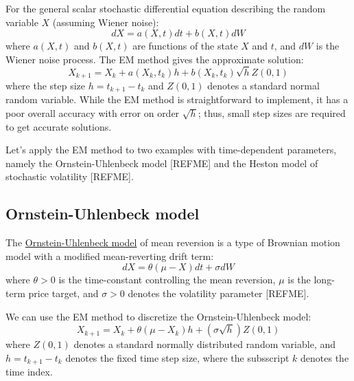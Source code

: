 \documentclass[11pt]{article}
\theoremstyle{definition}
\begin{document}
\begin{definition}\label{defn-em-method}
For the general scalar stochastic differential equation describing the random variable $X$ (assuming Wiener noise):
\begin{equation*}\label{eqn-generic-scalar-sde}
dX = a(X,t)dt + b(X,t)dW
\end{equation*}
where $a(X,t)$ and $b(X,t)$ are functions of the state $X$ and $t$, and $dW$ is the Wiener noise process.
The EM method gives the approximate solution:
\begin{equation*}\label{eqn-em-method}
X_{k+1} = X_{k} + a(X_{k}, t_{k})h + b(X_{k},t_{k})\sqrt{h}Z\left(0,1\right)
\end{equation*}
where the step size $h=t_{k+1} - t_{k}$ and $Z(0,1)$ denotes a standard normal random variable.  
While the EM method is straightforward to implement, it has a poor overall accuracy with error on order $\sqrt{h}$; 
thus, small step sizes are required to get accurate solutions.
\end{definition}
Let's apply the EM method to two examples with time-dependent parameters, 
namely the Ornstein-Uhlenbeck model [REFME] and the Heston model of stochastic volatility [REFME].

\subsection*{Ornstein-Uhlenbeck model}
The \href{https://en.wikipedia.org/wiki/Ornstein–Uhlenbeck_process}{Ornstein-Uhlenbeck model} of mean reversion is a type of Brownian motion model 
with a modified mean-reverting drift term:
\begin{equation*}\label{eqn-ou-model}
dX = \theta\left(\mu-X\right)dt + {\sigma}dW
\end{equation*}
where $\theta>0$ is the time-constant controlling the mean reversion, 
$\mu$ is the long-term price target, and $\sigma>0$ denotes the volatility parameter [REFME]. 

\begin{definition}\label{defn-ou-model}
We can use the EM method to discretize the Ornstein-Uhlenbeck model:
\begin{equation*}\label{eqn-EM-soln-OU-model}
X_{k+1} = X_{k} + \theta\left(\mu-X_{k}\right)h + \left(\sigma\sqrt{h}\right)Z(0,1)
\end{equation*}
where $Z(0,1)$ denotes a standard normally distributed random variable, 
and $h = t_{k+1} - t_{k}$ denotes the fixed time step size, where the subsscript $k$ denotes the time index.
\end{definition} 
\end{document}
